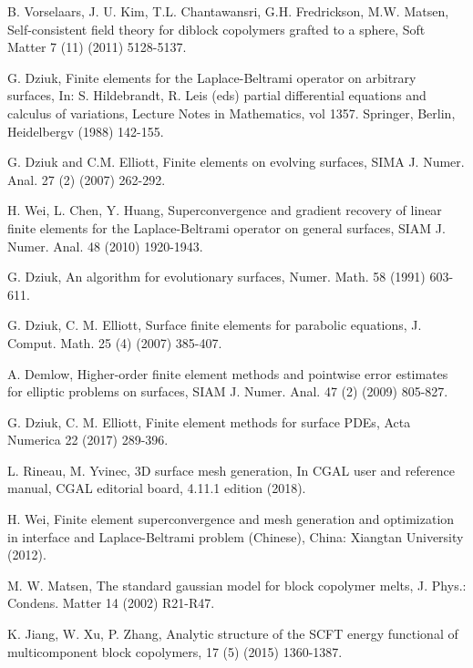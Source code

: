 \documentclass[final,1p,times]{elsarticle}
\begin{document}
\begin{thebibliography}{100}
B. Vorselaars, J. U. Kim, T.L. Chantawansri, G.H.
Fredrickson, M.W. Matsen, 
Self-consistent field theory for diblock copolymers grafted to a sphere,
{Soft Matter} 7 (11) (2011) 5128-5137.

{G. Dziuk},
{Finite elements for the Laplace-Beltrami operator on arbitrary surfaces},
{In:  S. Hildebrandt, R. Leis (eds) partial differential equations
and calculus of variations, Lecture Notes in Mathematics, vol 1357. Springer,
Berlin, Heidelbergv}
(1988) 142-155.

G. Dziuk and C.M. Elliott, 
Finite elements on evolving surfaces, 
{SIMA J. Numer.  Anal.}
27 (2) (2007) 262-292.


H. Wei, L. Chen, Y. Huang,
Superconvergence and gradient recovery of linear finite
elements for the Laplace-Beltrami operator on general surfaces,
{SIAM J. Numer. Anal.}
48 (2010) 1920-1943.

G. Dziuk, An algorithm for evolutionary surfaces, 
{Numer. Math.} 
58 (1991) 603-611.


G. Dziuk, C. M. Elliott,
Surface finite elements for parabolic equations,
{J. Comput. Math.}
25 (4) (2007) 385-407.

{A. Demlow}, 
{Higher-order finite element methods and pointwise error estimates
for elliptic problems on surfaces},
{SIAM J. Numer. Anal.} 47 (2) (2009) 805-827. 

{G. Dziuk,  C. M. Elliott},
{Finite element methods for surface PDEs},
{Acta Numerica} 
22 (2017) 289-396. 

{L. Rineau, M. Yvinec}, 
{3D surface mesh generation}, 
{In CGAL user and reference manual}, {CGAL editorial board, 4.11.1 edition} (2018). 

{H. Wei},
{Finite element superconvergence and mesh generation and optimization in
interface and Laplace-Beltrami problem (Chinese)}, {China: Xiangtan University} (2012).

M. W. Matsen,
The standard gaussian model for block copolymer melts,
{J. Phys.: Condens. Matter} 14 (2002) R21-R47.


K. Jiang, W. Xu, P. Zhang,
Analytic structure of the SCFT energy functional of multicomponent block
copolymers,
 17 (5) (2015) 1360-1387.


\end{thebibliography}
\end{document}

